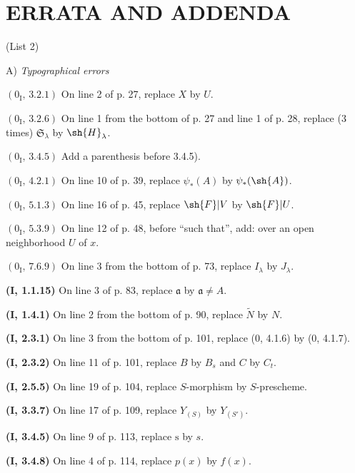 \clearpage
\thispagestyle{empty}
\null
\clearpage

\section*{ERRATA AND ADDENDA}
\begin{center}
(List 2)

\medskip
A) \emph{Typographical errors}
\end{center}

\noindent\textbf{$(0_{\mathrm I},\,3.2.1)$} On line 2 of p. 27, replace $X$
by $U$.

\noindent\textbf{$(0_{\mathrm I},\,3.2.6)$} On line 1 from the bottom of p.
27 and line 1 of p. 28, replace (3 times) $\mathfrak S_\lambda$ by
$\sh{H}_\lambda$.

\noindent\textbf{$(0_{\mathrm I},\,3.4.5)$} Add a parenthesis before 3.4.5).

\noindent\textbf{$(0_{\mathrm I},\,4.2.1)$} On line 10 of p. 39, replace
$\psi_*(A)$ by $\psi_*(\sh{A})$.

\noindent\textbf{$(0_{\mathrm I},\,5.1.3)$} On line 16 of p. 45, replace
$\sh{F}|V$ by $\sh{F}|U$.

\noindent\textbf{$(0_{\mathrm I},\,5.3.9)$} On line 12 of p. 48, before
``such that'', add: over an open neighborhood $U$ of $x$.

\noindent\textbf{$(0_{\mathrm I},\,7.6.9)$} On line 3 from the bottom of p.
73, replace $I_\lambda$ by $J_\lambda$.

\noindent\textbf{(I, 1.1.15)} On line 3 of p. 83, replace $\mathfrak a$ by
$\mathfrak a\ne A$.

\noindent\textbf{(I, 1.4.1)} On line 2 from the bottom of p. 90, replace
$\widetilde N$ by $N$.

\noindent\textbf{(I, 2.3.1)} On line 3 from the bottom of p. 101, replace (0,
4.1.6) by (0, 4.1.7).

\noindent\textbf{(I, 2.3.2)} On line 11 of p. 101, replace $B$ by $B_s$ and
$C$ by $C_t$.

\noindent\textbf{(I, 2.5.5)} On line 19 of p. 104, replace $S$-morphism by
$S$-prescheme.

\noindent\textbf{(I, 3.3.7)} On line 17 of p. 109, replace $Y_{(S)}$ by
$Y_{(S')}$.

\noindent\textbf{(I, 3.4.5)} On line 9 of p. 113, replace $\mathrm s$ by $s$.

\noindent\textbf{(I, 3.4.8)} On line 4 of p. 114, replace $p(x)$ by $f(x)$.

